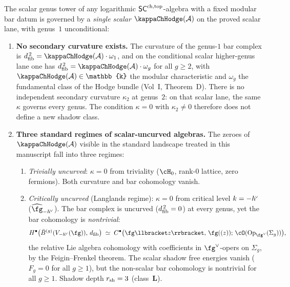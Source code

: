 \begin{theorem}
\label{thm:type-H-curvature-resolution}
The scalar genus tower of any logarithmic $\mathsf{SC}^{\mathrm{ch,top}}$-algebra with a
fixed modular bar datum is governed by a \emph{single scalar}
$\kappaChHodge(\cA)$ on the proved scalar lane, with genus~$1$
unconditional:
\begin{enumerate}[label=\textup{(\roman*)}]
\item \textbf{No secondary curvature exists.}
 The curvature of the genus-$1$ bar complex is
 $\dfib^{\,2} = \kappaChHodge(\cA) \cdot \omega_1$, and on the conditional
 scalar higher-genus lane one has
 $\dfib^{\,2} = \kappaChHodge(\cA) \cdot \omega_g$ for all $g \geq 2$,
 with $\kappaChHodge(\cA) \in \mathbb{k}$ the modular characteristic and
 $\omega_g$ the fundamental class of the Hodge bundle
 \textup{(}Vol~I, Theorem~D\textup{)}.
 There is no independent secondary curvature $\kappa_2$ at
 genus~$2$: on that scalar lane, the same $\kappa$ governs every genus.
 The condition $\kappa=0$ with $\kappa_2\neq0$ therefore does not
 define a new shadow class.
\item \textbf{Three standard regimes of scalar-uncurved algebras.}
 The zeroes of $\kappaChHodge(\cA)$ visible in the standard landscape treated
 in this manuscript fall into three regimes:
 \begin{enumerate}[label=\textup{(\alph*)}]
 \item \emph{Trivially uncurved}: $\kappa = 0$ from triviality
 ($\cH_0$, rank-$0$ lattice, zero fermions).
 Both curvature and bar cohomology vanish.
 \item \emph{Critically uncurved} \textup{(}Langlands regime\textup{)}:
 $\kappa = 0$ from critical level $k = -h^{\!\scriptscriptstyle\vee}$
 ($\widehat{\fg}_{-\hvee}$).
 The bar complex is uncurved ($d_{\mathrm{fib}}^{\,2} = 0$) at every genus,
 yet the bar cohomology is \emph{nontrivial}:
 \[
 H^\bullet\bigl(\barB^{(g)}(V_{-\hvee}(\fg)),\, \dfib\bigr)
 \;\simeq\;
 C^\bullet\bigl(\fg\llbracket z \rrbracket,\,
 \fg((z));\,
 \cO(\mathrm{Op}_{\fg^\vee}(\Sigma_g))\bigr),
 \]
 the relative Lie algebra cohomology with coefficients in
 $\fg^\vee$-opers on $\Sigma_g$, by the Feigin--Frenkel theorem.
 The scalar shadow free energies vanish
 ($F_g = 0$ for all $g \geq 1$), but the non-scalar bar cohomology
 is nontrivial for all $g \geq 1$.
 Shadow depth $r_{\mathrm{sh}} = 3$ \textup{(}class~$\mathbf L$\textup{)}.

\end{enumerate}
\end{enumerate}
\end{theorem}
